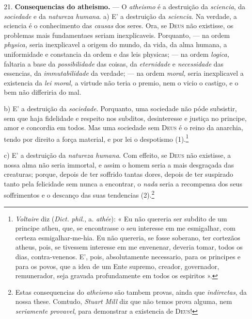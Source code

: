 21. \textbf{Consequencias do atheismo.} --- O \emph{atheismo} é a destruição da \emph{sciencia}, da \emph{sociedade} e da \emph{natureza humana}.
 a) E' a destruição da \emph{sciencia}. Na verdade, a sciencia é o conhecimento das \emph{causas} dos seres. Ora, se \textsc{Deus} não existisse, os problemas mais fundamentaes seriam inexplicaveis. Porquanto, --- na ordem \emph{physica,} seria inexplicavel a origem do mundo, da vida, da alma humana, a uniformidade e constancia da ordem e das leis physicas; --- na ordem \emph{logica,} faltaria a base da \emph{possibilidade} das coisas, da \emph{eternidade} e \emph{necessidade} das essencias, da \emph{immutabilidade} da verdade; --- na ordem \emph{moral,} seria inexplicavel a existencia da \emph{lei moral,} a virtude não teria o premio, nem o vicio o castigo, e o bem não differiria do mal.

b) E' a destruição da \emph{sociedade}. Porquanto, uma sociedade não póde subsistir, sem que haja fidelidade e respeito nos subditos, desinteresse e justiça no principe, amor e concordia em todos. Mas uma sociedade sem \textsc{Deus} é o reino da anarchia, tendo por direito a força material, e por lei o despotismo (1).\footnote{\emph{Voltaire} diz (\emph{Dict. phil.}, a. \emph{athée}): « Eu não quereria ser subdito de um principe atheu, que, se encontrasse o seu interesse em me esmigalhar, com certeza esmigalhar-me-hia. Eu não quereria, se fosse soberano, ter cortezãos atheus, pois, se tivessem interesse em me envenenar, deveria tomar, todos os dias, contra-venenos. E', pois, absolutamente necessario, para os principes e para os povos, que a idea de um Ente supremo, creador, governador, remunerador, seja gravada profundamente em todos os espiritos ».}

c) E' a destruição da \emph{natureza humana}. Com effeito, se \textsc{Deus} não existisse, a nossa alma não seria immortal, e assim o homem seria a mais desgraçada das creaturas; porque, depois de ter soffrido tantas dores, depois de ter suspirado tanto pela felicidade sem nunca a encontrar, o \emph{nada} seria a recompensa dos seus soffrimentos e o descanço das suas tendencias (2).\footnote{Estas consequencias do \emph{atheismo} são tambem provas, ainda que \emph{indirectas}, da nossa these. Comtudo, \emph{Stuart Mill} diz que não temos prova alguma, nem \emph{seriamente provavel}, para demonstrar a existencia de \textsc{Deus}!}
